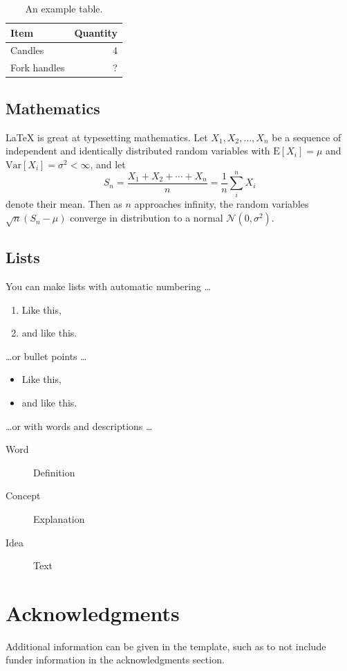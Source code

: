 \documentclass[fleqn,11pt]{olplainarticle}
\begin{document}
\begin{table}[ht]
\centering
\begin{tabular}{l|r}
Item & Quantity \\\hline
Candles & 4 \\
Fork handles & ?  
\end{tabular}
\caption{\label{tab:widgets}An example table.}
\end{table}

\subsection*{Mathematics}

\LaTeX{} is great at typesetting mathematics. Let $X_1, X_2, \ldots, X_n$ be a sequence of independent and identically distributed random variables with $\text{E}[X_i] = \mu$ and $\text{Var}[X_i] = \sigma^2 < \infty$, and let
$$S_n = \frac{X_1 + X_2 + \cdots + X_n}{n}
      = \frac{1}{n}\sum_{i}^{n} X_i$$
denote their mean. Then as $n$ approaches infinity, the random variables $\sqrt{n}(S_n - \mu)$ converge in distribution to a normal $\mathcal{N}(0, \sigma^2)$.

\subsection*{Lists}

You can make lists with automatic numbering \dots

\begin{enumerate}[noitemsep] 
\item Like this,
\item and like this.
\end{enumerate}
\dots or bullet points \dots
\begin{itemize}[noitemsep] 
\item Like this,
\item and like this.
\end{itemize}
\dots or with words and descriptions \dots
\begin{description}
\item[Word] Definition
\item[Concept] Explanation
\item[Idea] Text
\end{description}

\section*{Acknowledgments}

Additional information can be given in the template, such as to not include funder information in the acknowledgments section.


\end{document}
